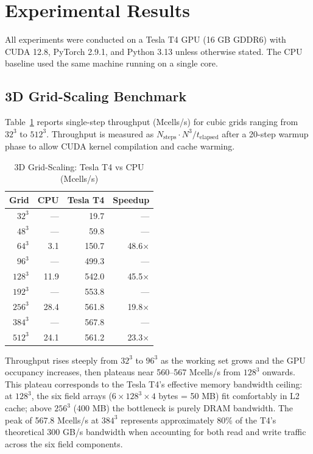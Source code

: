 \documentclass[10pt,twocolumn]{article}
\begin{document}
\section{Experimental Results}
\label{sec:results}

All experiments were conducted on a Tesla T4 GPU (16 GB GDDR6) with
CUDA 12.8, PyTorch 2.9.1, and Python 3.13 unless otherwise stated. The
CPU baseline used the same machine running on a single core.

\subsection{3D Grid-Scaling Benchmark}

Table~\ref{tab:3d_scaling} reports single-step throughput (Mcells/s) for
cubic grids ranging from $32^3$ to $512^3$. Throughput is measured as
$N_\text{steps} \cdot N^3 / t_\text{elapsed}$ after a 20-step warmup phase
to allow CUDA kernel compilation and cache warming.

\begin{table}[h]
\centering
\caption{3D Grid-Scaling: Tesla T4 vs CPU (Mcells/s)}
\label{tab:3d_scaling}
\begin{tabular}{rrrr}
\toprule
Grid & CPU & Tesla T4 & Speedup \\
\midrule
$32^3$   &  --- &   19.7 &   --- \\
$48^3$   &  --- &   59.8 &   --- \\
$64^3$   &  3.1 &  150.7 & 48.6$\times$ \\
$96^3$   &  --- &  499.3 &   --- \\
$128^3$  & 11.9 &  542.0 & 45.5$\times$ \\
$192^3$  &  --- &  553.8 &   --- \\
$256^3$  & 28.4 &  561.8 & 19.8$\times$ \\
$384^3$  &  --- &  567.8 &   --- \\
$512^3$  & 24.1 &  561.2 & 23.3$\times$ \\
\bottomrule
\end{tabular}
\end{table}

Throughput rises steeply from $32^3$ to $96^3$ as the working set grows and
the GPU occupancy increases, then plateaus near 560--567 Mcells/s from $128^3$
onwards. This plateau corresponds to the Tesla T4's effective memory bandwidth
ceiling: at $128^3$, the six field arrays ($6 \times 128^3 \times 4$ bytes
= 50 MB) fit comfortably in L2 cache; above $256^3$ (400 MB) the bottleneck
is purely DRAM bandwidth. The peak of 567.8 Mcells/s at $384^3$ represents
approximately 80\% of the T4's theoretical 300 GB/s bandwidth when accounting
for both read and write traffic across the six field components.
\end{document}
